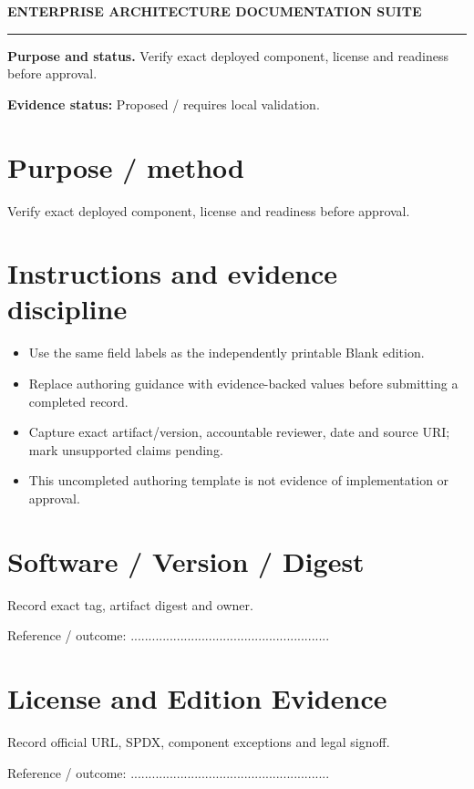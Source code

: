 \documentclass[10pt,letterpaper]{article}
\begin{document}
\begin{center}
{\large\bfseries\color{teal} ENTERPRISE ARCHITECTURE DOCUMENTATION SUITE}\par
{}\par
{}\par
\end{center}
\vspace{8pt}\hrule\vspace{12pt}
\textbf{Purpose and status.} Verify exact deployed component, license and readiness before approval.\par
\textbf{Evidence status:} Proposed / requires local validation.\par
\section{Purpose / method}
Verify exact deployed component, license and readiness before approval.\par
\section{Instructions and evidence discipline}
\begin{itemize}
\item Use the same field labels as the independently printable Blank edition.
\item Replace authoring guidance with evidence-backed values before submitting a completed record.
\item Capture exact artifact/version, accountable reviewer, date and source URI; mark unsupported claims pending.
\item This uncompleted authoring template is not evidence of implementation or approval.
\end{itemize}
\section{Software / Version / Digest}
Record exact tag, artifact digest and owner.\par
Reference / outcome: ........................................................\par
\section{License and Edition Evidence}
Record official URL, SPDX, component exceptions and legal signoff.\par
Reference / outcome: ........................................................\par
\end{document}

